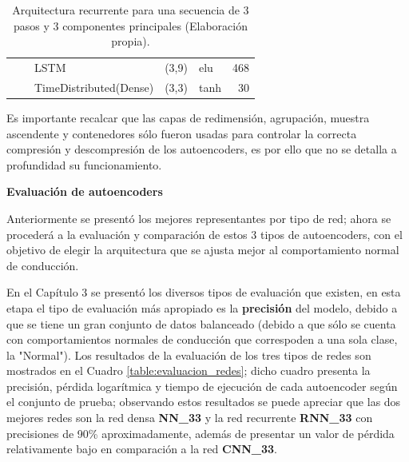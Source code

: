 \begin{table}[H]
\begin{center}
\begin{tabular}{ll|l|r|l|r|}
\multicolumn{1}{|l|}{}                              &                             & LSTM                               & (3,9)                                & elu                                     & 468                                         \\ \cline{3-6} 
\multicolumn{1}{|l|}{}                              &                             & TimeDistributed(Dense)             & (3,3)                                & tanh                                     & 30                                          \\ \hline
\end{tabular}
\end{center}
\caption{Arquitectura recurrente para una secuencia de 3 pasos y 3 componentes principales (Elaboraci\'{o}n propia).}
\label{table:rnn33}
\end{table}

Es importante recalcar que las capas de redimensi\'{o}n, agrupaci\'{o}n, muestra ascendente y contenedores s\'{o}lo fueron usadas para controlar la correcta compresi\'{o}n y descompresi\'{o}n de los autoencoders, es por ello que no se detalla a profundidad su funcionamiento.

\vspace{5mm} %

\textbf{Evaluaci\'{o}n de autoencoders}

\vspace{5mm} %

Anteriormente se present\'{o} los mejores representantes por tipo de red; ahora se proceder\'{a} a la evaluaci\'{o}n y comparaci\'{o}n de estos 3 tipos de autoencoders, con el objetivo de elegir la arquitectura que se ajusta mejor al comportamiento normal de conducci\'{o}n.

\vspace{5mm} %

En el Cap\'{i}tulo 3 se present\'{o} los diversos tipos de evaluaci\'{o}n que existen, en esta etapa el tipo de evaluaci\'{o}n m\'{a}s apropiado es la \textbf{precisi\'{o}n} del modelo, debido a que se tiene un gran conjunto de datos balanceado (debido a que s\'{o}lo se cuenta con comportamientos normales de conducci\'{o}n que correspoden a una sola clase, la "Normal"). Los resultados de la evaluaci\'{o}n de los tres tipos de redes son mostrados en el Cuadro \ref{table:evaluacion_redes}; dicho cuadro presenta la precisi\'{o}n, p\'{e}rdida logar\'{i}tmica y tiempo de ejecuci\'{o}n de cada autoencoder seg\'{u}n el conjunto de prueba; observando estos resultados se puede apreciar que las dos mejores redes son la red densa \textbf{NN\_33} y la red recurrente \textbf{RNN\_33} con precisiones de 90\% aproximadamente, adem\'{a}s de presentar un valor de p\'{e}rdida relativamente bajo en comparaci\'{o}n a la red \textbf{CNN\_33}.


